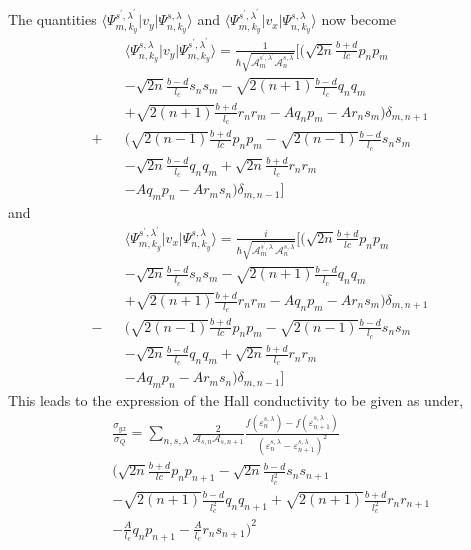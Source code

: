 \documentclass[prb,twocolumn]{revtex4-1}
\begin{document}
The quantities $\langle\Psi_{m,k_y}^{s^\prime,\lambda^\prime}\vert v_y\vert \Psi_{n,k_y}^{s,\lambda}\rangle$ and $\langle\Psi_{m,k_y}^{s^\prime,\lambda^\prime}\vert v_x\vert \Psi_{n,k_y}^{s,\lambda}\rangle$ now become
\begin{eqnarray}\label{vy_exp}
&&\langle\Psi_{n,k_y}^{s,\lambda}\vert v_y\vert \Psi_{m,k_y}^{s^\prime,\lambda^\prime} \rangle=\frac{1}{\hbar\sqrt{\mathcal{A}_m^{s^\prime,\lambda^\prime}\mathcal{A}_n^{s,\lambda}}}\Big[\Big(\sqrt{2n}\frac{b+d}{lc}p_np_m\nonumber\\
&&-\sqrt{2n}\frac{b-d}{l_c}s_ns_m-\sqrt{2(n+1)}\frac{b-d}{l_c}q_nq_m\nonumber\\&&+\sqrt{2(n+1)}\frac{b+d}{l_c}r_nr_m-Aq_np_m-Ar_ns_m\Big)\delta_{m,n+1}\nonumber\\+
&&\Big(\sqrt{2(n-1)}\frac{b+d}{lc}p_np_m-\sqrt{2(n-1)}\frac{b-d}{l_c}s_ns_m\nonumber\\&&
-\sqrt{2n}\frac{b-d}{l_c}q_nq_m+\sqrt{2n}\frac{b+d}{l_c}r_nr_m\nonumber\\&&-Aq_mp_n-Ar_ms_n\Big)\delta_{m,n-1}
\Big]
\end{eqnarray}
and
\begin{eqnarray}\label{vx_exp}
&&\langle\Psi_{m,k_y}^{s^\prime,\lambda^\prime}\vert v_x\vert \Psi_{n,k_y}^{s,\lambda}\rangle=\frac{i}{\hbar\sqrt{\mathcal{A}_m^{s^\prime,\lambda^\prime}\mathcal{A}_n^{s,\lambda}}}\Big[\Big(\sqrt{2n}\frac{b+d}{lc}p_np_m\nonumber\\
&&-\sqrt{2n}\frac{b-d}{l_c}s_ns_m-\sqrt{2(n+1)}\frac{b-d}{l_c}q_nq_m\nonumber\\&&+\sqrt{2(n+1)}\frac{b+d}{l_c}r_nr_m-Aq_np_m-Ar_ns_m\Big)\delta_{m,n+1}\nonumber\\-
&&\Big(\sqrt{2(n-1)}\frac{b+d}{lc}p_np_m-\sqrt{2(n-1)}\frac{b-d}{l_c}s_ns_m\nonumber\\&&
-\sqrt{2n}\frac{b-d}{l_c}q_nq_m+\sqrt{2n}\frac{b+d}{l_c}r_nr_m\nonumber\\&&-Aq_mp_n-Ar_ms_n\Big)\delta_{m,n-1}
\Big]
\end{eqnarray}
This leads to the expression of the Hall conductivity to be given as under,
\begin{eqnarray}\label{hall_con_form_1}
&&\frac{\sigma_{yx}}{\sigma_Q}=\sum_{n,s,\lambda}\frac{2}{\mathcal{A}_{s,n}\mathcal{A}_{s,n+1}}\frac{f(\varepsilon_n^{s,\lambda})-f(\varepsilon_{n+1}^{s,\lambda})}{(\varepsilon_{n}^{s,\lambda}-\varepsilon_{n+1}^{s,\lambda})^2}\nonumber\\
&&\Big(\sqrt{2n}\frac{b+d}{lc}p_np_{n+1}
-\sqrt{2n}\frac{b-d}{l_c^2}s_ns_{n+1}
\nonumber\\&&
-\sqrt{2(n+1)}\frac{b-d}{l_c^2}q_nq_{n+1}+\sqrt{2(n+1)}\frac{b+d}{l_c^2}r_nr_{n+1}\nonumber\\&&-\frac{A}{l_c}q_np_{n+1}-\frac{A}{l_c}r_ns_{n+1}\Big)^2
\end{eqnarray}
\end{document}
